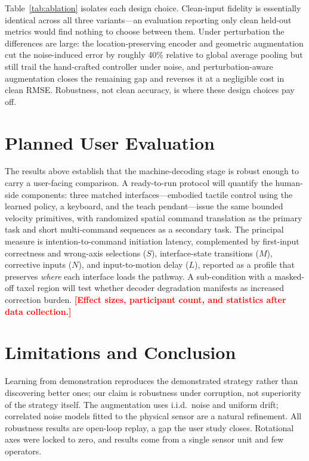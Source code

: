 \documentclass[runningheads]{llncs}
\newcommand{\TBD}[1]{\textcolor{red}{\textbf{[#1]}}}
\begin{document}
Table~\ref{tab:ablation} isolates each design choice. Clean-input
fidelity is essentially identical across all three variants---an
evaluation reporting only clean held-out metrics would find nothing to
choose between them. Under perturbation the differences are large: the
location-preserving encoder and geometric augmentation cut the
noise-induced error by roughly 40\% relative to global average pooling
but still trail the hand-crafted controller under noise, and
perturbation-aware augmentation closes the remaining gap and reverses
it at a negligible cost in clean RMSE. Robustness, not clean accuracy,
is where these design choices pay off.

\section{Planned User Evaluation}
\label{sec:userstudy}

The results above establish that the machine-decoding stage is robust
enough to carry a user-facing comparison. A ready-to-run protocol will
quantify the human-side components: three matched interfaces---embodied
tactile control using the learned policy, a keyboard, and the teach
pendant---issue the same bounded velocity primitives, with randomized
spatial command translation as the primary task and short multi-command
sequences as a secondary task. The principal measure is
intention-to-command initiation latency, complemented by first-input
correctness and wrong-axis selections ($S$), interface-state transitions
($M$), corrective inputs ($N$), and input-to-motion delay ($L$),
reported as a profile that preserves \emph{where} each interface loads
the pathway. A sub-condition with a masked-off taxel region will test
whether decoder degradation manifests as increased correction burden.
\TBD{Effect sizes, participant count, and statistics after data
collection.}

\section{Limitations and Conclusion}
\label{sec:conclusion}

Learning from demonstration reproduces the demonstrated strategy rather
than discovering better ones; our claim is robustness under corruption,
not superiority of the strategy itself. The augmentation uses i.i.d.\
noise and uniform drift; correlated noise models fitted to the physical
sensor are a natural refinement. All robustness results are open-loop
replay, a gap the user study closes. Rotational axes were locked to
zero, and results come from a single sensor unit and few operators.
\end{document}
